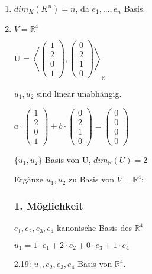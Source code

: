 \documentclass[a4paper, openany]{book}
\begin{document}
    \begin{enumerate}[label=(\alph*)]
      \item $dim_K(K^n) = n$, da $e_1,...,e_n$ Basis.

      \item $V = \mathbb{R}^4$

      U = $\left \langle \begin{pmatrix}1 \\ 2 \\ 0 \\1 \end{pmatrix}, \begin{pmatrix}0 \\ 2 \\ 1 \\ 0 \end{pmatrix} \right \rangle_{\mathbb{R}}$

      $u_1, u_2$ sind linear unabhängig.

      $a \cdot \begin{pmatrix}1 \\ 2 \\ 0 \\ 1 \end{pmatrix} + b \cdot \begin{pmatrix}0 \\ 2 \\ 1 \\ 0 \end{pmatrix} = \begin{pmatrix}0 \\ 0 \\ 0 \\ 0 \end{pmatrix}$

      $\{u_1, u_2\} $ Basis von U, $dim_{\mathbb{R}}(U) = 2$

      Ergänze $u_1, u_2$ zu Basis von $V = \mathbb{R}^4$:

      \subsubsection{1. Möglichkeit}

      $e_1, e_2, e_3, e_4$ kanonische Basis des $\mathbb{R}^4$

      $u_1 = 1 \cdot e_1 + 2 \cdot e_2 + 0 \cdot e_3 + 1 \cdot e_4$

      \par \medskip

      2.19: $u_1, e_2, e_3, e_4$ Basis von $\mathbb{R}^4$.


\end{enumerate}
\end{document}
